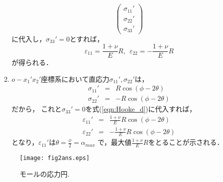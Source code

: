 \documentclass[10pt,a4j]{jarticle}
\begin{document}
\begin{enumerate}
\begin{equation}
		\left(
		\begin{array}{c}
			\sigma_{11}' \\
			\sigma_{22}' \\
			\sigma_{33}'
		\end{array}
		\right)
		\label{eqn:Hooke_d}
	\end{equation}
	に代入し，$\sigma_{33}'=0$とすれば，
	\begin{equation}
		\varepsilon_{11}=\frac{1+\nu}{E}R, \ \ 
		\varepsilon_{22}=-\frac{1+\nu}{E}R
	\end{equation}
	が得られる．
\item
	$o-x_1'x_2'$座標系において直応力$\sigma_{11}',\sigma_{22}'$は，
	\begin{eqnarray}
		\sigma_{11}'&=&R\cos(\phi-2\theta) \\ 
		\sigma_{22}'&=&-R\cos(\phi-2\theta) 
	\end{eqnarray}
	だから，
	これと$\sigma_{33}'=0$を式(\ref{eqn:Hooke_d})に代入すれば，
	\begin{eqnarray}
		\varepsilon_{11}'&=&\frac{1+\nu}{E}R\cos(\phi-2\theta) \\ 
		\varepsilon_{22}'&=&-\frac{1+\nu}{E}R\cos(\phi-2\theta) 
	\end{eqnarray}
	となり，$\varepsilon_{11}'$は$\theta=\frac{\phi}{2}=\alpha_{max}$
	で，最大値$\frac{1+\nu}{E}R$をとることが示される．
\end{enumerate}
\begin{figure}
	\begin{center}
	\texttt{[image: fig2ans.eps]} 
	\end{center}
	\caption{モールの応力円.} 
	\label{fig:fig2}
\end{figure}
\end{document}

